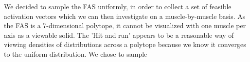 \begin{methods}
We decided to sample the FAS uniformly, in order to collect a set of feasible activation vectors which we can then investigate on a muscle-by-muscle basis. As the FAS is a 7-dimensional polytope, it cannot be visualized with one muscle per axis as a viewable solid. The 'Hit and run' appears to be a reasonable way of viewing densities of distributions across a polytope because we know it converges to the uniform distribution. We chose to sample 
\end{methods}